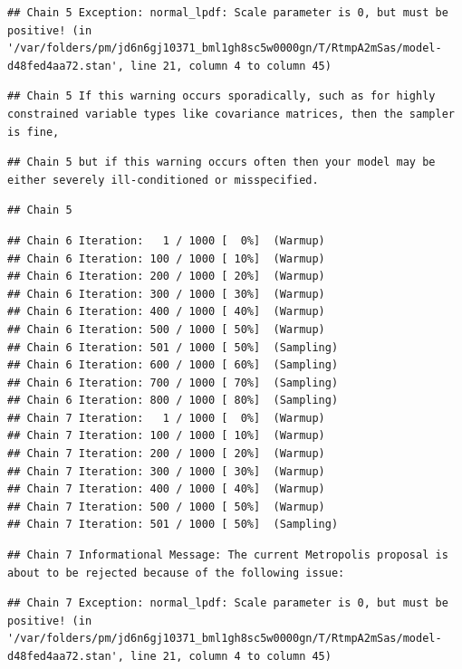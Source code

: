 \documentclass[
]{book}
\begin{document}
\begin{verbatim}
## Chain 5 Exception: normal_lpdf: Scale parameter is 0, but must be positive! (in '/var/folders/pm/jd6n6gj10371_bml1gh8sc5w0000gn/T/RtmpA2mSas/model-d48fed4aa72.stan', line 21, column 4 to column 45)
\end{verbatim}

\begin{verbatim}
## Chain 5 If this warning occurs sporadically, such as for highly constrained variable types like covariance matrices, then the sampler is fine,
\end{verbatim}

\begin{verbatim}
## Chain 5 but if this warning occurs often then your model may be either severely ill-conditioned or misspecified.
\end{verbatim}

\begin{verbatim}
## Chain 5
\end{verbatim}

\begin{verbatim}
## Chain 6 Iteration:   1 / 1000 [  0%]  (Warmup) 
## Chain 6 Iteration: 100 / 1000 [ 10%]  (Warmup) 
## Chain 6 Iteration: 200 / 1000 [ 20%]  (Warmup) 
## Chain 6 Iteration: 300 / 1000 [ 30%]  (Warmup) 
## Chain 6 Iteration: 400 / 1000 [ 40%]  (Warmup) 
## Chain 6 Iteration: 500 / 1000 [ 50%]  (Warmup) 
## Chain 6 Iteration: 501 / 1000 [ 50%]  (Sampling) 
## Chain 6 Iteration: 600 / 1000 [ 60%]  (Sampling) 
## Chain 6 Iteration: 700 / 1000 [ 70%]  (Sampling) 
## Chain 6 Iteration: 800 / 1000 [ 80%]  (Sampling) 
## Chain 7 Iteration:   1 / 1000 [  0%]  (Warmup) 
## Chain 7 Iteration: 100 / 1000 [ 10%]  (Warmup) 
## Chain 7 Iteration: 200 / 1000 [ 20%]  (Warmup) 
## Chain 7 Iteration: 300 / 1000 [ 30%]  (Warmup) 
## Chain 7 Iteration: 400 / 1000 [ 40%]  (Warmup) 
## Chain 7 Iteration: 500 / 1000 [ 50%]  (Warmup) 
## Chain 7 Iteration: 501 / 1000 [ 50%]  (Sampling)
\end{verbatim}

\begin{verbatim}
## Chain 7 Informational Message: The current Metropolis proposal is about to be rejected because of the following issue:
\end{verbatim}

\begin{verbatim}
## Chain 7 Exception: normal_lpdf: Scale parameter is 0, but must be positive! (in '/var/folders/pm/jd6n6gj10371_bml1gh8sc5w0000gn/T/RtmpA2mSas/model-d48fed4aa72.stan', line 21, column 4 to column 45)
\end{verbatim}
\end{document}
